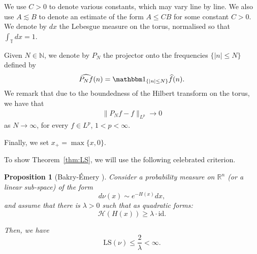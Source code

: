 \documentclass[letterpaper, 11pt,  reqno]{amsart}
\newtheorem{proposition}[theorem]{Proposition}
\theoremstyle{definition}
\newcommand{\1}{\mathbbm 1}
\newcommand{\noi}{\noindent}
\newcommand{\R}{\mathbb{R}}
\newcommand{\T}{\mathbb{T}}
\renewcommand{\H}{\mathcal H}
\newcommand{\0}{\mathbf 0}
\newcommand{\ld}{\lambda}
\newcommand{\ft}{\widehat}
\newcommand{\les}{\lesssim}
\newcommand{\ind}{\mathbbm 1}
\newcommand{\N}{\mathbb{N}}
\renewcommand{\H}{\mathcal{H}}
\newcommand{\jw}[1]{\marginpar{\color{red} $\Leftarrow\Leftarrow\Leftarrow$}{\smallskip \noi\color{purple}JW: #1}\smallskip}
\newcommand{\gp}[1]{\marginpar{\color{red} $\Leftarrow\Leftarrow\Leftarrow$}{\smallskip \noi\color{teal}GP: #1}\smallskip}
\renewcommand{\ft}{\widehat}
\numberwithin{equation}{section}
\numberwithin{theorem}{section}
\begin{document}
 
 
 
We use $C>0$ to denote various constants, which may vary line by line. We also use $A\les B$ to denote an estimate of the form $A\leq CB$ for some constant $C>0$. We denote by $dx$ the Lebesgue measure on the torus, normalised so that $\int_\T dx = 1$.
 
 
 
Given $N \in \N$, 
we denote by  $P_N$
 the projector onto the frequencies 
$\{|n| \leq N\}$
defined by 
\begin{align*}
 \ft{P_N f}(n)= \ind_{\{|n|\leq N\}} \ft f(n).
\end{align*}
We remark that due to the boundedness of the Hilbert transform on the torus, we have that 
\begin{align}\label{PNconvergence}
    \| P_N f - f \|_{L^p} \to 0 
\end{align}
as $N\to \infty$, for every $f \in L^p$, $1<p<\infty$.
 
 
 
 
 
 
 
Finally, we set $x_+ = \max\{x,0\}$.
 
 
To show Theorem~\ref{thm:LS}, 
we will use the following celebrated criterion.
\begin{proposition}[Bakry-\'Emery \cite{BaEm}] \label{prop:BaEm}
Consider a probability measure on $\R^n$ (or a linear sub-space) of the form 
$$ d\nu(x) \sim e^{-H(x)}dx, $$
and assume that there is $\ld >0 $ such that as quadratic forms:
\begin{equation}\label{strongconvexity}
    \H(H(x)) \ge \ld \cdot \mathrm{id}.
\end{equation}
 
 
\noi
Then, we have
$$ \mathrm{LS}(\nu) \le \frac{2}{\ld} < \infty.$$
\end{proposition}
 
 
\end{document}
